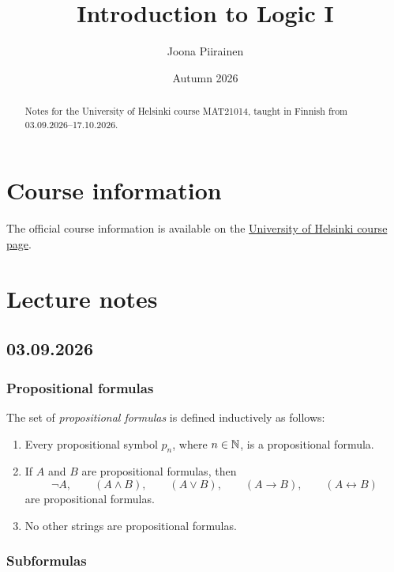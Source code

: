 \documentclass[11pt,a4paper]{amsart}
\title{Introduction to Logic I}
\author{Joona Piirainen}
\date{Autumn 2026}
\begin{document}
\maketitle

\begin{abstract}
  Notes for the University of Helsinki course MAT21014, taught in Finnish
  from 03.09.2026--17.10.2026.
\end{abstract}

\tableofcontents

\section{Course information}

The official course information is available on the
\href{https://studies.helsinki.fi/kurssit/opintojakso/otm-836bfa0a-198b-4cab-b040-6c0bd165b235/MAT21014}{University
of Helsinki course page}.

\section{Lecture notes}

\subsection{03.09.2026}

\subsubsection{Propositional formulas}

\begin{definition}
  The set of \emph{propositional formulas} is defined inductively as follows:
  \begin{enumerate}
    \item Every propositional symbol \(p_n\), where \(n \in \mathbb{N}\), is a
      propositional formula.
    \item If \(A\) and \(B\) are propositional formulas, then
      \[
        \neg A, \qquad
        (A \land B), \qquad
        (A \lor B), \qquad
        (A \rightarrow B), \qquad
        (A \leftrightarrow B)
      \]
      are propositional formulas.
    \item No other strings are propositional formulas.
  \end{enumerate}
\end{definition}

\subsubsection{Subformulas}
\end{document}
